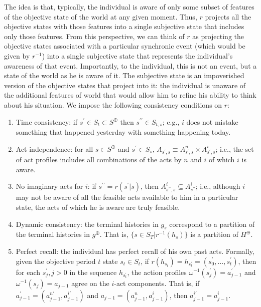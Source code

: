 \documentclass[
11pt,
titlepage,
reqno,
]{article}%
\theoremstyle{definition}
\begin{document}
The idea is that, typically, the individual is aware of only some subset of features of the objective state of the world at any given moment.
Thus, $r$ projects all the objective states with those features into a single subjective state that includes only those features.
From this perspective, we can think of $r$ as projecting the objective states associated with a particular synchronic event (which would be given by $r^{-1}$) into a single subjective state that represents the individual's awareness of that event.
Importantly, to the individual, this is not an event, but a state of the world as he is aware of it.
The subjective state is an impoverished version of the objective states that project into it: the individual is unaware of the additional features of world that would allow him to refine his ability to think about his situation. 
We impose the following consistency conditions on $r$:
\begin{enumerate}
	\item Time consistency: if $s^\prime\in S_t\subset S^\oplus$ then $s^{\prime\prime}\in S_{t,s}$; e.g., $i$ does not mistake something that happened yesterday with something happening today.
	\item Act independence: for all $s\in S^\oplus$ and $s^\prime\in S_s$, $A_{s^\prime,s}\equiv A^n_{s^\prime,s}\times A^i_{s^\prime,s}$; i.e., the set of act profiles includes all combinations of the acts by $n$ and $i$ of which $i$ is aware.
	\item No imaginary acts for $i$: if $s^{\prime\prime}=r(s^\prime|s)$, then $A^i_{s^{\prime\prime},s}\subseteq A^i_{s^{\prime\prime}}$; i.e., although $i$ may not be aware of all the feasible acts available to him in a particular state, the acts of which he is aware are truly feasible.
	\item Dynamic consistency: the terminal histories in $g_s$ correspond to a partition of the terminal histories in $g^\oplus$. That is, $\{s\in S_T|r^{-1}(h_s)\}$ is a partition of $H^\oplus$.
	\item Perfect recall: the individual has perfect recall of his own past acts. Formally, given the objective period $t$ state  $s_t\in S_t$, if $r(h_{s_t})=h_{s^\prime_t}=(s^\prime_0,\ldots,s^\prime_t)$, then for each $s^\prime_j,j>0$ in the sequence $h_{s^\prime_t}$, the action profiles $\omega^{-1}(s^\prime_j)=a^\prime_{j-1}$ and $\omega^{-1}(s_j)=a_{j-1}$ agree on the $i$-act components. That is, if $a^\prime_{j-1}=(a^{n\prime}_{j-1},a^{i\prime}_{j-1})$ and $a_{j-1}=(a^n_{j-1},a^i_{j-1})$, then $a^{i\prime}_{j-1}=a^i_{j-1}$.
\end{enumerate}
\end{document}
